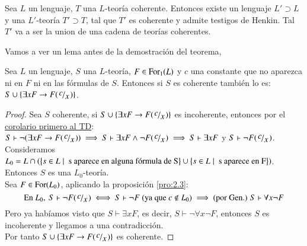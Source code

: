 \begin{thm}\label{thm:henkin}
    Sea $L$ un lenguaje, $T$ una $L$-teoría coherente. Entonces existe un lenguaje $L' \supset L$ y una $L'$-teoría $T' \supset T$, tal que $T'$ es coherente y admite testigos de Henkin. Tal $T'$ va a ser la union de una cadena de teorías coherentes.
\end{thm}
Vamos a ver un lema antes de la demostración del teorema,
\begin{lm}
    Sea $L$ un lenguaje, $S$ una $L$-teoría, $F \in \mathrm{For}_1(L)$ y $c$ una constante que no aparezca ni en $F$ ni en las fórmulas de $S$. Entonces si $S$ es coherente también lo es: $S \cup \sdf{\exists x F \then F(\quox c)}$.
\end{lm}

\begin{proof}
    Sea $S$ coherente, si $S \cup \sdf{\exists x F \then F(\quox c)}$ es incoherente, entonces por el \hyperref[cor:td1]{corolario primero al TD}: $S \vdash \neg ( \exists x F \then F(\quox c)) \implies S \vdash \exists x F \land \neg F (\quox c) \implies S \vdash \exists x F$ y $S \vdash \neg F(\quox c)$.\\

    Consideramos $L_0 = L \cap (\left\{s \in L \mid \text{ s aparece en alguna fórmula de S}\right\} \cup \left\{s \in L \mid \text{ s aparece en F}\right\})$. Entonces $S$ es una $L_0$-teoría.\\
    Sea $F \in \mathrm{For}(L_0)$, aplicando la proposición \ref{pro:2.3}:
    $$
        \text{En } L_0,\ S \vdash \neg F(\quox c) \iff S \vdash \neg F \text{ (ya que $c \notin L_0$)} \implies \text{(por Gen.) } S \vdash \forall x \neg F
    $$
    Pero ya habíamos visto que $S \vdash \exists x F$, es decir, $S \vdash \neg \forall x \neg F$, entonces $S$ es incoherente y llegamos a una contradicción.\\

    Por tanto $S \cup \sdf{\exists x F \then F(\quox c)}$ es coherente.
\end{proof}

